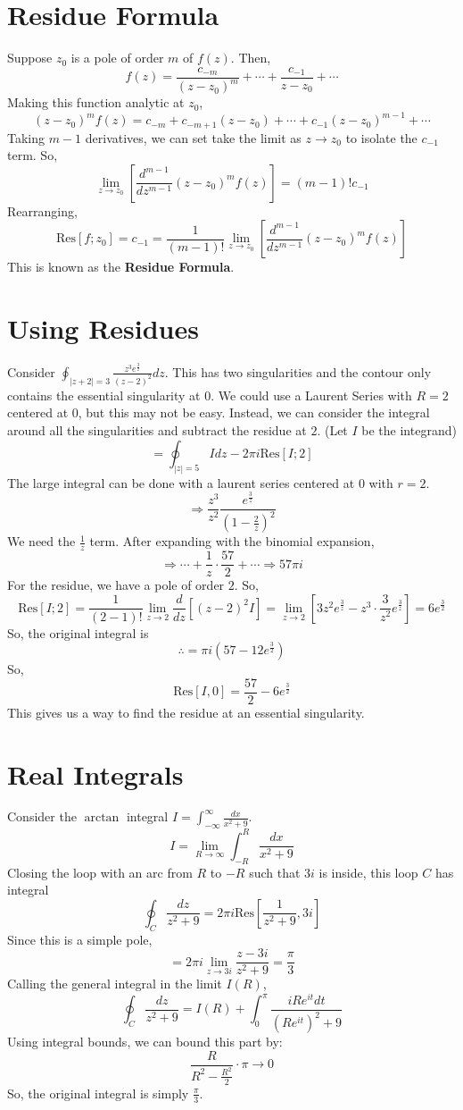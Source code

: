 \documentclass[../main.tex]{subfiles}
\begin{document}
\section{Residue Formula}
Suppose $z_{0}$ is a pole of order $m$ of $f(z)$. Then,
$$f(z)=\frac{c_{-m}}{(z-z_{0})^{m}}+\cdots+\frac{c_{-1}}{z-z_0}+\cdots$$
Making this function analytic at $z_{0}$,
$$(z-z_0)^{m}f(z)=c_{-m}+c_{-m+1}(z-z_{0})+\cdots+c_{-1}(z-z_0)^{m-1}+\cdots$$
Taking $m-1$ derivatives, we can set take the limit as $z\rightarrow z_{0}$ to isolate the $c_{-1}$ term.
So,
$$\lim_{z\rightarrow z_0}\left[\frac{d^{m-1}}{dz^{m-1}}(z-z_0)^{m}f(z)\right]=(m-1)!c_{-1}$$
Rearranging,
$$\boxed{\text{Res}[f;z_0]=c_{-1}=\frac{1}{(m-1)!}\lim_{z\rightarrow z_{0}}
\left[\frac{d^{m-1}}{dz^{m-1}}(z-z_0)^{m}f(z)\right]}$$
This is known as the \textbf{Residue Formula}.

\section{Using Residues}
Consider $\oint_{|z+2|=3}\frac{z^{3}e^{\frac{3}{z}}}{(z-2)^2}dz$. This has two singularities and the contour
only contains the essential singularity at $0$. We could use a Laurent Series with $R=2$ centered at $0$, but 
this may not be easy. Instead, we can consider the integral around all the singularities and subtract the residue
at $2$. (Let $I$ be the integrand)
$$=\oint_{|z|=5}Idz-2\pi i\text{Res}[I;2]$$
The large integral can be done with a laurent series centered at $0$ with $r=2$. 
$$\Rightarrow \frac{z^{3}}{z^{2}}\frac{e^{\frac{3}{z}}}{(1-\frac{2}{z})^{2}}$$
We need the $\frac{1}{z}$ term. After expanding with the binomial expansion,
$$\Rightarrow \cdots + \frac{1}{z}\cdot \frac{57}{2}+\cdots \Rightarrow 57\pi i$$
For the residue, we have a pole of order $2$. So,
$$\text{Res}[I;2]=\frac{1}{(2-1)!}\lim_{z\rightarrow 2}\frac{d}{dz}\left[
    (z-2)^{2}I
\right]=\lim_{z\rightarrow 2}\left[3z^{2}e^{\frac{3}{z}}
-z^{3}\cdot \frac{3}{z^{2}}e^{\frac{3}{z}}\right]
=6e^{\frac{3}{2}}$$
So, the original integral is
$$\therefore =\pi i(57-12e^{\frac{3}{2}})$$
So,
$$\text{Res}[I,0]=\frac{57}{2}-6e^{\frac{3}{2}}$$
This gives us a way to find the residue at an essential singularity.

\section{Real Integrals}
Consider the $\arctan$ integral $I=\int_{-\infty}^{\infty}\frac{dx}{x^{2}+9}$.
$$I=\lim_{R\rightarrow\infty}\int_{-R}^{R}\frac{dx}{x^{2}+9}$$
Closing the loop with an arc from $R$ to $-R$ such that $3i$ is inside, this loop $C$ has integral
$$\oint_{C}\frac{dz}{z^{2}+9}=2\pi i \text{Res}[\frac{1}{z^{2}+9},3i]$$
Since this is a simple pole,
$$=2\pi i\lim_{z\rightarrow 3i}\frac{z-3i}{z^{2}+9}=\frac{\pi}{3}$$
Calling the general integral in the limit $I(R)$,
$$\oint_{C}\frac{dz}{z^{2}+9}=I(R)+\int_{0}^{\pi}\frac{iRe^{it}dt}{(Re^{it})^{2}+9}$$
Using integral bounds, we can bound this part by:
$$\frac{R}{R^{2}-\frac{R^{2}}{2}}\cdot \pi \rightarrow 0$$
So, the original integral is simply $\frac{\pi}{3}$.
\end{document}
